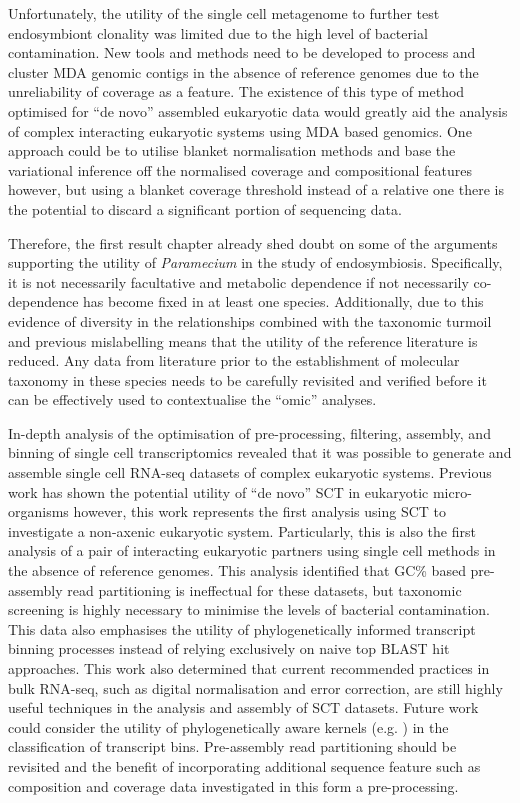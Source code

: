 Unfortunately, the utility of the single cell metagenome to further
test endosymbiont clonality was limited due to 
the high level of bacterial contamination.
New tools and methods need to be developed to process and cluster
MDA genomic contigs in the absence of reference genomes
due to the unreliability of coverage as a feature.  The existence
of this type of method optimised for ``de novo'' assembled eukaryotic data
would greatly aid the analysis of complex interacting eukaryotic
systems using MDA based genomics.   One approach could be to utilise
blanket normalisation methods and base the variational inference
off the normalised coverage and compositional features however,
but using a blanket coverage threshold instead of a relative one
there is the potential to discard a significant portion of sequencing
data.

Therefore, the first result chapter already
shed doubt on some of the arguments supporting the utility of
\textit{Paramecium} in the study of endosymbiosis. Specifically,
it is not necessarily facultative and metabolic dependence if not
necessarily co-dependence has become fixed in at least one
species.  Additionally, due to this evidence of diversity
in the relationships combined with the taxonomic turmoil and previous
mislabelling means that the utility of the reference literature
is reduced. Any data from literature prior to the establishment
of molecular taxonomy in these species needs to be carefully
revisited and verified before it can be effectively used to
contextualise the ``omic'' analyses.


In-depth analysis of the optimisation of pre-processing,
filtering, assembly, and binning of single cell transcriptomics
revealed that it was possible to generate and assemble
single cell RNA-seq datasets of complex eukaryotic
systems. Previous work has shown the potential utility
of ``de novo'' SCT in eukaryotic micro-organisms \citep{Kolisko2014}
however, this work represents the first analysis
using SCT to investigate a non-axenic eukaryotic system.
Particularly, this is also the first analysis of a pair
of interacting eukaryotic partners using single cell methods
in the absence of reference genomes. 
This analysis identified that GC\% based pre-assembly read partitioning
is ineffectual for these datasets, but taxonomic screening
is highly necessary to minimise the levels of bacterial contamination.
This data also emphasises the utility of phylogenetically
informed transcript binning processes instead of relying
exclusively on naive top BLAST hit approaches. 
This work also determined that current recommended practices
 in bulk RNA-seq, such as digital normalisation and error correction,
 are still highly useful techniques in the analysis and assembly
 of SCT datasets.
Future work could consider the utility of phylogenetically aware
kernels (e.g. \citet{Vert2002}) in the classification
of transcript bins. Pre-assembly read partitioning
should be revisited and the benefit of incorporating
additional sequence feature such as composition
and coverage data investigated in this form a pre-processing.


